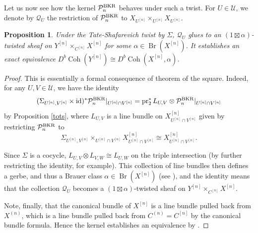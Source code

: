 \documentclass{amsart}
\theoremstyle{plain}
\newtheorem{proposition}[theorem]{Proposition}
\theoremstyle{definition}
\theoremstyle{remark}
\begin{document}
    Let us now see how the kernel $\mathcal P_n^{\rm BKR}$ behaves under such a twist.
    For $U\in\mathcal U$, we denote by $\mathcal Q_U$ the restriction of $\mathcal P_n^{\rm BKR}$ to $X_{U^{[n]}}\times_{U^{[n]}}X_{U^{[n]}}$.
    \begin{proposition}
        Under the Tate-Shafarevich twist by $\Sigma$, $\mathcal Q_U$ glues to an $(1\boxtimes\alpha)$-twisted sheaf on $Y^{[n]}\times_{C^{[n]}}X^{[n]}$ for some $\alpha\in\operatorname{Br}(X^{[n]})$.
        It establishes an exact equivalence $D^b\operatorname{Coh}(Y^{[n]})\cong D^b\operatorname{Coh}(X^{[n]},\alpha)$.
    \end{proposition}
    \begin{proof}
        This is essentially a formal consequence of theorem of the square.
        Indeed, for any $U,V\in\mathcal U$, we have the identity
        \[(\Sigma_{U^{[n]},V^{[n]}}\times\operatorname{id})^\ast\mathcal P_n^{\rm BKR}|_{U^{[n]}\cap V^{[n]}}=\operatorname{pr}_2^\ast L_{U,V}\otimes\mathcal P_n^{\rm BKR}|_{U^{[n]}\cap V^{[n]}}\]
        by Proposition \ref{tots}, where $L_{U,V}$ is a line bundle on $X_{U^{[n]}\cap V^{[n]}}^{[n]}$ given by restricting $\mathcal P_n^{\rm BKR}$ to
        \[\Sigma_{U^{[n]},V^{[n]}}\times_{U^{[n]}\cap V^{[n]}}X^{[n]}_{U^{[n]}\cap V^{[n]}}\cong X^{[n]}_{U^{[n]}\cap V^{[n]}}.\]

        Since $\Sigma$ is a cocycle, $L_{U,V}\otimes L_{V,W}\cong L_{U,W}$ on the triple intersection (by further restricting the identity, for example).
        This collection of line bundles then defines a gerbe, and thus a Brauer class $\alpha\in\operatorname{Br}(X^{[n]})$ (see \cite{caldararu}), and the identity means that the collection $\mathcal Q_U$ becomes a $(1\boxtimes\alpha)$-twisted sheaf on $Y^{[n]}\times_{C^{[n]}}X^{[n]}$.

        Note, finally, that the canonical bundle of $X^{[n]}$ is a line bundle pulled back from $X^{(n)}$, which is a line bundle pulled back from $C^{(n)}=C^{[n]}$ by the canonical bundle formula.
        Hence the kernel establishes an equivalence by \cite[Theorem 3.2.1]{caldararu}.
    \end{proof}
    
    
\end{document}
